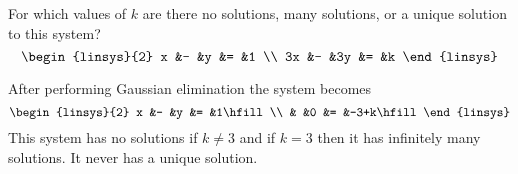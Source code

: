 

\begin{Exercise}[
name={},
title={}, 
difficulty=0,
origin={\cite{JH}}]
For which values of \( k \) are
there no solutions, many solutions, or a unique solution
to this system?
\begin{equation*}
\begin{linsys}{2}
x  &-  &y  &=  &1  \\
3x  &-  &3y &=  &k  
\end{linsys}
\end{equation*}

\end{Exercise}

\begin{Answer}
After performing Gaussian elimination the system becomes
\begin{equation*}
\begin{linsys}{2}
x  &-  &y  &=  &1\hfill  \\
   &   &0  &=  &-3+k\hfill  
\end{linsys}
\end{equation*}
This system has no solutions if \( k\neq 3 \) and if
\( k=3 \) then it has infinitely many solutions.
It never has a unique solution.  
\end{Answer}
